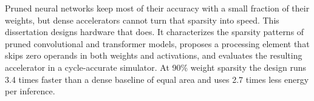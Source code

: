 Pruned neural networks keep most of their accuracy with a small fraction of their weights, but
dense accelerators cannot turn that sparsity into speed. This dissertation designs hardware that
does. It characterizes the sparsity patterns of pruned convolutional and transformer models,
proposes a processing element that skips zero operands in both weights and activations, and
evaluates the resulting accelerator in a cycle-accurate simulator. At 90\% weight sparsity the
design runs 3.4 times faster than a dense baseline of equal area and uses 2.7 times less energy
per inference.
